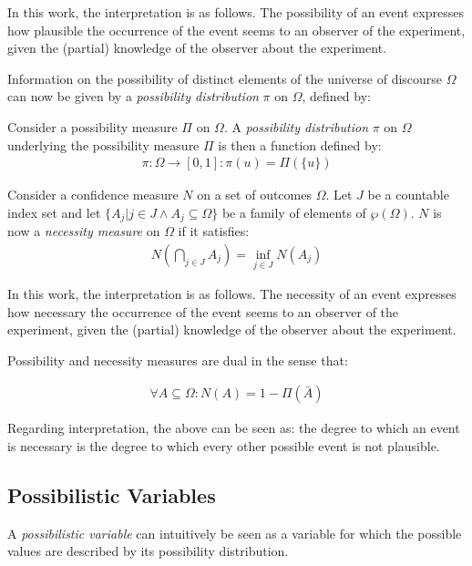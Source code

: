 In this work, the interpretation is as follows. The possibility of an event expresses how plausible the occurrence of the event seems to an observer of the experiment, given the (partial) knowledge of the observer about the experiment.

Information on the possibility of distinct elements of the universe of discourse $\Omega$ can now be given by a \emph{possibility distribution} $\pi$ on $\Omega$, defined by:

\begin{definition}
Consider a possibility measure $\Pi$ on $\Omega$. A \emph{possibility distribution} $\pi$ on $\Omega$ underlying the possibility measure $\Pi$ is then a function defined by:
	\begin{align}
	\pi : \Omega \rightarrow \left[0, 1\right] : \pi(u) = \Pi(\{u\})
	\end{align}
\end{definition}

\begin{definition}
Consider a confidence measure $N$ on a set of outcomes $\Omega$. Let $J$ be a countable index set and let $\{ A_{j} | j \in J \wedge A_{j} \subseteq \Omega \}$ be a family of elements of $\wp(\Omega)$. $N$ is now a \emph{necessity measure} on $\Omega$ if it satisfies:
	\begin{align}
	N\left(\bigcap_{j \in J} A_{j} \right) = \inf_{j \in J} N(A_{j})
	\end{align}
\end{definition}

In this work, the interpretation is as follows. The necessity of an event expresses how necessary the occurrence of the event seems to an observer of the experiment, given the (partial) knowledge of the observer about the experiment.

Possibility and necessity measures are dual in the sense that:

\begin{align}
\forall A \subseteq \Omega : N(A) = 1 - \Pi(\bar{A})
\end{align}

Regarding interpretation, the above can be seen as: the degree to which an event is necessary is the degree to which every other possible event is not plausible.

\subsection{\label{subsec:possibilistic-variables}Possibilistic Variables}
A \emph{possibilistic variable} can intuitively be seen as a variable for which the possible values are described by its possibility distribution\cite{Pon11}.

